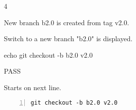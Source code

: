 \begin{description}[align=right,leftmargin=3.2cm,labelindent=3.0cm]
\item[Step:] 4
\item[Confirm:] New branch b2.0 is created from tag v2.0.
\item[Expectation:] Switch to a new branch "b2.0" is displayed.
\item[Command:] echo git  checkout -b b2.0 v2.0
\item[Test Result:] PASS
\item[Evidence:] Starts on next line.
\end{description}
\begin{lstlisting}[numbers=left]
git checkout -b b2.0 v2.0

\end{lstlisting}

